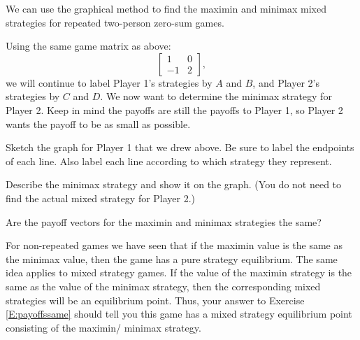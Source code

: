 





We can use the graphical method to find the maximin and minimax mixed strategies for repeated  two-person zero-sum games. 

Using the same game matrix as above: \[\left[\begin{matrix}
1&0\\
-1&2

\end{matrix}\right],
\]
we will continue to label Player 1's strategies by $A$ and $B$, and Player 2's strategies by $C$ and $D$. We now want to determine the minimax strategy for Player 2. Keep in mind the payoffs are still the payoffs to Player 1, so Player 2 wants the payoff to be as small as possible.

\begin{xca}\label{E:sketchgraphagain}
Sketch the graph for Player 1 that we drew above. Be sure to label the endpoints  of each line. Also label each line according to which strategy they represent. 
\end{xca}

\begin{xca}\label{E:showminimax}
Describe the minimax strategy and show it on the graph. (You do not need to find the actual mixed strategy for Player 2.) 
\end{xca}

\begin{xca}\label{E:payoffssame}
Are the payoff vectors for the maximin and minimax strategies the same?
\end{xca}

For non-repeated games we have seen that if the maximin value is the same as the minimax value, then the game has a pure strategy equilibrium. The same idea applies to mixed strategy games. If the value of the maximin  strategy is the same as the value of the minimax strategy, then the corresponding mixed strategies will be an equilibrium point. Thus, your answer to Exercise \ref{E:payoffssame} should tell you this game has a mixed strategy equilibrium point consisting of the maximin/ minimax strategy.

